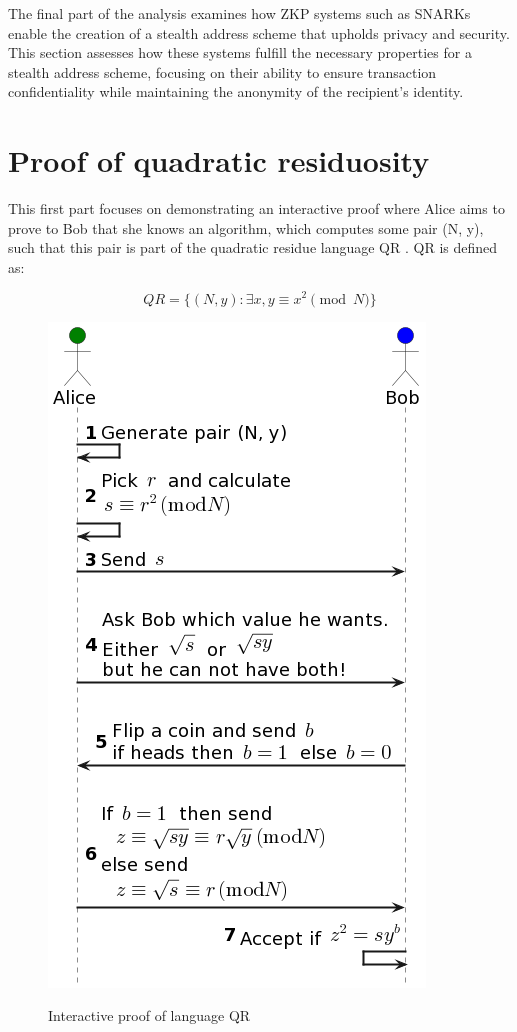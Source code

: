 The final part of the analysis examines how ZKP systems such as SNARKs enable
the creation of a stealth address scheme that upholds privacy and security.
This section assesses how these systems fulfill the necessary properties for a
stealth address scheme, focusing on their ability to ensure transaction
confidentiality while maintaining the anonymity of the recipient's identity.

\section{Proof of quadratic residuosity}

This first part focuses on demonstrating an interactive proof where Alice aims
to prove to Bob that she knows an algorithm, which computes some pair (N, y),
such that this pair is part of the quadratic residue language QR \cite{Goldwasser1989}.
QR is defined as:

\[QR = \lbrace(N, y): \exists x, y \equiv x^2 \pmod{N}\rbrace\]

\begin{figure}[h!]
    \centering
    \includegraphics[scale=0.6]{assets/images/qr_ip.png}
    \caption{Interactive proof of language QR}
	\cite{Goldwasser1989, youtubeMOOCLecture1}
    \label{fig:qr_ip}
    \vspace{0.5cm}
\end{figure}

